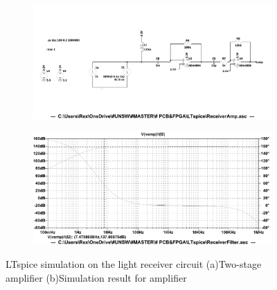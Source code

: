 \begin{figure}[H]
\centering
\begin{subfigure}{1\textwidth}
  \centering
  \includegraphics[width=1\linewidth]{4-ANC_Sys/LTspiceAmpSch.pdf}
  \caption{}
  \label{fig_LTspiceAmpSch}
\end{subfigure}
\begin{subfigure}{1\textwidth}
  \centering
  \includegraphics[width=1\linewidth]{4-ANC_Sys/LTspiceAmp.pdf}
  \caption{}
  \label{fig_LTspiceAmp}
\end{subfigure}
\caption{LTspice simulation on the light receiver circuit (a)Two-stage amplifier (b)Simulation result for amplifier}
\label{fig_LTspiceSim1}
\end{figure}

